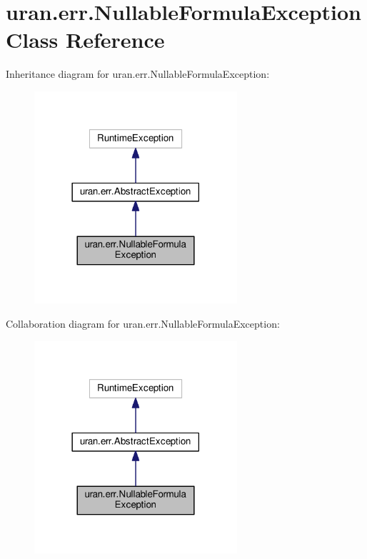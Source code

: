 \hypertarget{classuran_1_1err_1_1_nullable_formula_exception}{}\section{uran.\+err.\+Nullable\+Formula\+Exception Class Reference}
\label{classuran_1_1err_1_1_nullable_formula_exception}


Inheritance diagram for uran.\+err.\+Nullable\+Formula\+Exception\+:
\nopagebreak
\begin{figure}[H]
\begin{center}
\leavevmode
\includegraphics[width=213pt]{classuran_1_1err_1_1_nullable_formula_exception__inherit__graph}
\end{center}
\end{figure}


Collaboration diagram for uran.\+err.\+Nullable\+Formula\+Exception\+:
\nopagebreak
\begin{figure}[H]
\begin{center}
\leavevmode
\includegraphics[width=213pt]{classuran_1_1err_1_1_nullable_formula_exception__coll__graph}
\end{center}
\end{figure}
